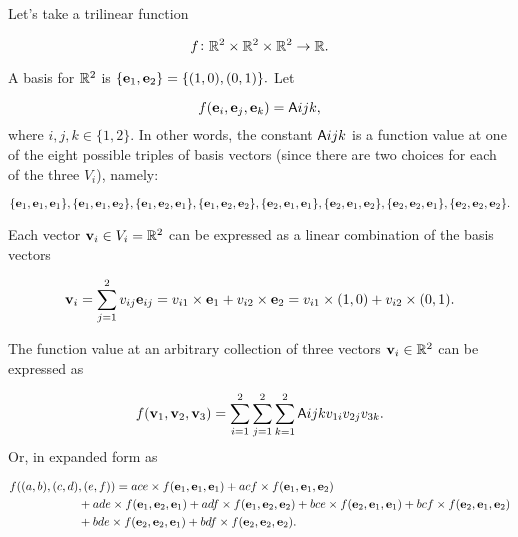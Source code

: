 \begin{exa}

Let's take a trilinear function

\[f\colon \mathbb{R}^2\times \mathbb{R}^2\times \mathbb{R}^2\to \mathbb{R}.\] 

A basis for $\mathbb{R}^2$ is
\(\{\mathbf{ e}_{1}, \mathbf{ e}_{2}\} = \{(1,0), (0,1)\}.\)
Let

\[f(\mathbf{ e}_{i},\mathbf{ e}_{j},\mathbf{ e}_{k}) = \mathsf{A}{ijk},\]
where \(i,j,k \in \{1,2\}\). In other words, the constant \(\mathsf{A}{i j k}\)
is a function value at one of the eight possible triples of basis
vectors (since there are two choices for each of the three \(V_i\)),
namely:

\[\{\mathbf{ e}_1, \mathbf{ e}_1, \mathbf{ e}_1\}, 
\{\mathbf{ e}_1, \mathbf{ e}_1, \mathbf{ e}_2\}, 
\{\mathbf{ e}_1, \mathbf{ e}_2, \mathbf{ e}_1\},
\{\mathbf{ e}_1, \mathbf{ e}_2, \mathbf{ e}_2\},
\{\mathbf{ e}_2, \mathbf{ e}_1, \mathbf{ e}_1\}, 
\{\mathbf{ e}_2, \mathbf{ e}_1, \mathbf{ e}_2\}, 
\{\mathbf{ e}_2, \mathbf{ e}_2, \mathbf{ e}_1\},
\{\mathbf{ e}_2, \mathbf{ e}_2, \mathbf{ e}_2\}.\]

Each vector \(\mathbf{ v}_i \in V_i = \mathbb{R}^2\) can be expressed as a linear
combination of the basis vectors

\[\mathbf{ v}_i = \displaystyle\sum_{j=1}^{2} v_{ij} \mathbf{ e}_{ij} = v_{i1} \times \mathbf{ e}_1 + v_{i2} \times \mathbf{ e}_2 = v_{i1} \times (1, 0) + v_{i2} \times (0, 1).\]

The function value at an arbitrary collection of three vectors
\(\mathbf{ v}_i \in \mathbb{R}^2\) can be expressed as

\[f(\mathbf{ v}_1,\mathbf{ v}_2, \mathbf{ v}_3) = \displaystyle\sum_{i=1}^{2} \displaystyle\sum_{j=1}^{2} \displaystyle\sum_{k=1}^{2} \mathsf{A}{i j k} v_{1i} v_{2j} v_{3k}.\]
Or, in expanded form as

\begin{align}
f((a,b),(c,d)&, (e,f)) = ace \times f(\mathbf{ e}_1, \mathbf{ e}_1, \mathbf{ e}_1) + acf \times f(\mathbf{ e}_1, \mathbf{ e}_1, \mathbf{ e}_2) \\
&+ ade \times f(\mathbf{ e}_1, \mathbf{ e}_2, \mathbf{ e}_1) +
adf \times f(\mathbf{ e}_1, \mathbf{ e}_2, \mathbf{ e}_2) +
bce \times f(\mathbf{ e}_2, \mathbf{ e}_1, \mathbf{ e}_1) +
bcf \times f(\mathbf{ e}_2, \mathbf{ e}_1, \mathbf{ e}_2) \\ 
&+ bde \times f(\mathbf{ e}_2, \mathbf{ e}_2, \mathbf{ e}_1) +
bdf \times f(\mathbf{ e}_2, \mathbf{ e}_2, \mathbf{ e}_2).
\end{align}
\end{exa}



